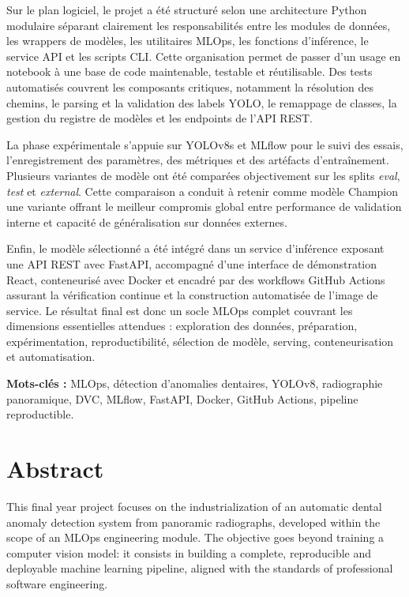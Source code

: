\documentclass{rapportENSIAS}
\begin{document}
Sur le plan logiciel, le projet a été structuré selon une architecture Python modulaire séparant clairement les responsabilités entre les modules de données, les wrappers de modèles, les utilitaires MLOps, les fonctions d'inférence, le service API et les scripts CLI. Cette organisation permet de passer d'un usage en notebook à une base de code maintenable, testable et réutilisable. Des tests automatisés couvrent les composants critiques, notamment la résolution des chemins, le parsing et la validation des labels YOLO, le remappage de classes, la gestion du registre de modèles et les endpoints de l'API REST.

La phase expérimentale s'appuie sur YOLOv8s et MLflow pour le suivi des essais, l'enregistrement des paramètres, des métriques et des artéfacts d'entraînement. Plusieurs variantes de modèle ont été comparées objectivement sur les splits \textit{eval}, \textit{test} et \textit{external}. Cette comparaison a conduit à retenir comme modèle Champion une variante offrant le meilleur compromis global entre performance de validation interne et capacité de généralisation sur données externes.

Enfin, le modèle sélectionné a été intégré dans un service d'inférence exposant une API REST avec FastAPI, accompagné d'une interface de démonstration React, conteneurisé avec Docker et encadré par des workflows GitHub Actions assurant la vérification continue et la construction automatisée de l'image de service. Le résultat final est donc un socle MLOps complet couvrant les dimensions essentielles attendues : exploration des données, préparation, expérimentation, reproductibilité, sélection de modèle, serving, conteneurisation et automatisation.

\textbf{Mots-clés :} MLOps, détection d'anomalies dentaires, YOLOv8, radiographie panoramique, DVC, MLflow, FastAPI, Docker, GitHub Actions, pipeline reproductible.

\newpage

\chapter*{Abstract}

This final year project focuses on the industrialization of an automatic dental anomaly detection system from panoramic radiographs, developed within the scope of an MLOps engineering module. The objective goes beyond training a computer vision model: it consists in building a complete, reproducible and deployable machine learning pipeline, aligned with the standards of professional software engineering.
\end{document}
